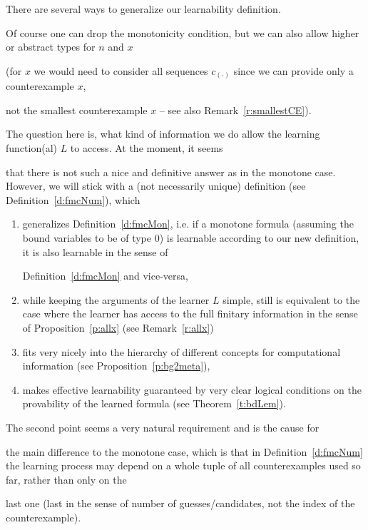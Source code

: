 \documentclass[1p]{elsarticle}
\theoremstyle{plain}
\theoremstyle{definition}
\theoremstyle{remark}
\theoremstyle{definition}
\begin{document}
There are several ways to generalize our learnability definition. 

Of course one can drop the monotonicity condition, but we can also allow higher or abstract types for $n$ and $x$ 

(for $x$ we would need to consider all sequences $c_{(\cdot)}$ since we can provide only a counterexample $x$, 

not the smallest counterexample $x$ -- see also Remark~\ref{r:smallestCE}). 

The question here is, what kind of information we do allow the learning function(al) $L$ to access. At the moment, it seems 

that there is not such a nice and definitive answer as in the monotone case. However, we will stick with a (not necessarily unique) definition (see Definition~\ref{d:fmcNum}), which

\begin{enumerate} 

\item generalizes Definition~\ref{d:fmcMon}, i.e. if a monotone formula (assuming the bound variables to be of type $0$) is learnable according to our new definition, it is also learnable in the sense of 

Definition~\ref{d:fmcMon} and vice-versa,

\item while keeping the arguments of the learner $L$ simple, still is equivalent to the case where the learner has access to the full finitary information in the sense of Proposition~\ref{p:allx} (see Remark~\ref{r:allx})

\item fits very nicely into the hierarchy of different concepts for computational information (see Proposition~\ref{p:bg2meta}),

\item makes effective learnability guaranteed by very clear logical conditions on the provability of the learned formula (see Theorem~\ref{t:bdLem}).

\end{enumerate} 

The second point seems a very natural requirement and is the cause for 

the main difference to the monotone case, which is that in Definition~\ref{d:fmcNum} the learning process may depend on a whole tuple of all counterexamples used so far, rather than only on the 

last one (last in the sense of number of guesses/candidates, not the index of the counterexample). 
\end{document}
